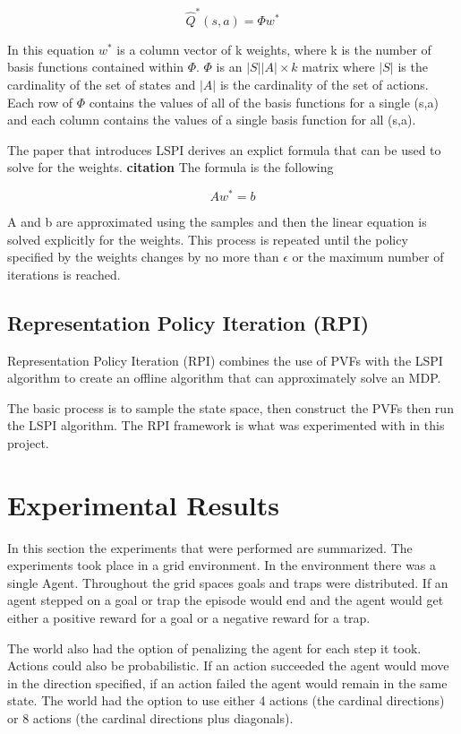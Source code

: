 \documentclass[12pt, letterpaper, final]{report}
\begin{document}
\[
\hat{Q}^*(s,a) = \Phi w^*
\]

In this equation $w^*$ is a column vector of k weights, where k is the
number of basis functions contained within $\Phi$. $\Phi$ is an
$|S||A| \times k$ matrix where $|S|$ is the cardinality of the set of
states and $|A|$ is the cardinality of the set of actions. Each row of
$\Phi$ contains the values of all of the basis functions for a single
(s,a) and each column contains the values of a single basis function
for all (s,a).

The paper that introduces LSPI derives an explict formula that can be
used to solve for the weights. {\bf citation} The formula is the
following

\[ Aw^* = b\]

A and b are approximated using the samples and then the linear
equation is solved explicitly for the weights. This process is
repeated until the policy specified by the weights changes by no more
than $\epsilon$ or the maximum number of iterations is reached.

\subsection*{Representation Policy Iteration (RPI)}

Representation Policy Iteration (RPI) combines the use of PVFs with
the LSPI algorithm to create an offline algorithm that can
approximately solve an MDP.

The basic process is to sample the state space, then construct the
PVFs then run the LSPI algorithm. The RPI framework is what was
experimented with in this project.

\section{Experimental Results}

In this section the experiments that were performed are
summarized. The experiments took place in a grid environment. In the
environment there was a single Agent. Throughout the grid spaces goals
and traps were distributed. If an agent stepped on a goal or trap the
episode would end and the agent would get either a positive reward for
a goal or a negative reward for a trap.

The world also had the option of penalizing the agent for each step it
took. Actions could also be probabilistic. If an action succeeded the
agent would move in the direction specified, if an action failed the
agent would remain in the same state. The world had the option to use
either 4 actions (the cardinal directions) or 8 actions (the cardinal
directions plus diagonals).
\end{document}
